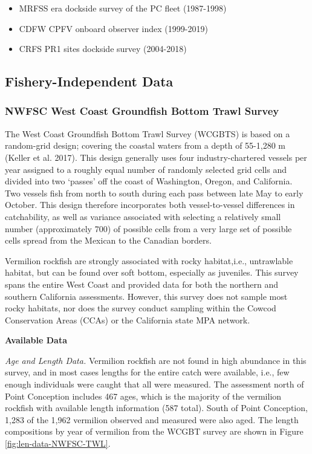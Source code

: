 \documentclass[
  english,
  a4paper,
]{article}
\providecommand{\tightlist}{%
  \setlength{\itemsep}{0pt}\setlength{\parskip}{0pt}}
\begin{document}
\begin{itemize}
\tightlist
\item
  MRFSS era dockside survey of the PC fleet (1987-1998)
\item
  CDFW CPFV onboard observer index (1999-2019)
\item
  CRFS PR1 sites dockside survey (2004-2018)
\end{itemize}

\hypertarget{fishery-independent-data}{%
\subsection{Fishery-Independent Data}\label{fishery-independent-data}}

\hypertarget{nwfsc-west-coast-groundfish-bottom-trawl-survey}{%
\subsubsection{NWFSC West Coast Groundfish Bottom Trawl Survey}\label{nwfsc-west-coast-groundfish-bottom-trawl-survey}}

The West Coast Groundfish Bottom Trawl Survey (WCGBTS) is based on a random-grid design;
covering the coastal waters from a depth of 55-1,280 m (Keller et al. 2017).
This design generally uses four industry-chartered vessels per year assigned to
a roughly equal number of randomly selected grid cells and divided into two `passes'
off the coast of Washington, Oregon, and California. Two vessels fish from north to south during each pass between late
May to early October. This design therefore incorporates both vessel-to-vessel
differences in catchability, as well as variance associated with selecting a
relatively small number (approximately 700) of possible cells from a very large
set of possible cells spread from the Mexican to the Canadian borders.

Vermilion rockfish are strongly associated with rocky
habitat,i.e., untrawlable habitat, but can be found over soft bottom, especially as
juveniles. This survey spans the entire West Coast and provided data for both the northern
and southern California assessments. However, this survey does not sample most rocky habitats, nor does the survey conduct sampling within the Cowcod Conservation Areas (CCAs) or the California state MPA network.

\textbf{Available Data}

\emph{Age and Length Data.} Vermilion rockfish are not found in high abundance in this survey, and in most
cases lengths for the entire catch were available, i.e., few enough individuals were caught that
all were measured. The assessment north of Point Conception includes 467 ages, which
is the majority of the vermilion rockfish with available length information (587 total).
South of Point Conception, 1,283 of the 1,962 vermilion observed and measured were also aged.
The length compositions by year of vermilion from the WCGBT survey are shown in Figure \ref{fig:len-data-NWFSC-TWL}.
\end{document}

